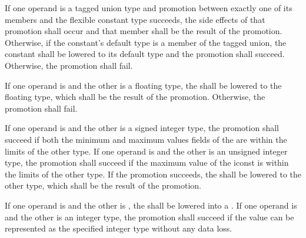 \specsubitem
If one operand is a tagged union type and promotion between exactly one of its
members and the flexible constant type succeeds, the side effects of that
promotion shall occur and that member shall be the result of the promotion.
Otherwise, if the constant's default type is a member of the tagged union, the
constant shall be lowered to its default type and the promotion shall succeed.
Otherwise, the promotion shall fail.

\specsubitem
If one operand is  and the other is a floating type, the
 shall be lowered to the floating type, which shall be the
result of the promotion. Otherwise, the promotion shall fail.


\specsubitem
If one operand is  and the other is a signed integer type, the
promotion shall succeed if both the minimum and maximum values fields of the
 are within the limits of the other type. If one operand is
 and the other is an unsigned integer type, the promotion shall
succeed if the maximum value of the iconst is within the limits of the other
type. If the promotion succeeds, the  shall be lowered to the
other type, which shall be the result of the promotion.

\specsubitem
If one operand is  and the other is , the
 shall be lowered into a . If one operand is
 and the other is an integer type, the promotion shall succeed
if the  value can be represented as the specified integer type
without any data loss.

